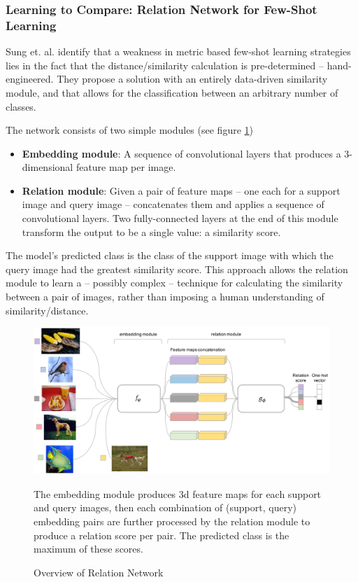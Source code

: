 \documentclass{report}
\begin{document}
\subsubsection{Learning to Compare: Relation Network for Few-Shot Learning}
Sung et. al. \parencite{relationnet} identify that a weakness in metric based few-shot learning strategies lies in the fact that the distance/similarity calculation is pre-determined -- hand-engineered. They propose a solution with an entirely data-driven similarity module, and that allows for the classification between an arbitrary number of classes. \par
The network consists of two simple modules (see figure \ref{fig:relation-net:1})
\begin{itemize}
 \item\textbf{Embedding module}: A sequence of convolutional layers that produces a 3-dimensional feature map per image.
 \item\textbf{Relation module}: Given a pair of feature maps -- one each for a support image and query image -- concatenates them and applies a sequence of convolutional layers. Two fully-connected layers at the end of this module transform the output to be a single value: a similarity score.
\end{itemize}
The model's predicted class is the class of the support image with which the query image had the greatest similarity score. This approach allows the relation module to learn a -- possibly complex -- technique for calculating the similarity between a pair of images, rather than imposing a human understanding of similarity/distance. \par
\begin{figure}[h]
 \centering
 \includegraphics[width=14cm]{relationnet}
 \caption{Overview of Relation Network}
 The embedding module produces 3d feature maps for each support and query images, then each combination of (support, query) embedding pairs are further processed by the relation module to produce a relation score per pair. The predicted class is the maximum of these scores.
 \label{fig:relation-net:1}
\end{figure}
\end{document}
